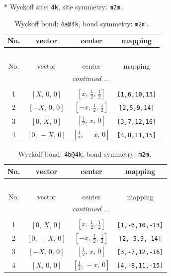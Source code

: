 \documentclass[fleqn,8pt]{jsarticle}
\begin{document}
* Wyckoff site: {\tt 4k}, site symmetry: {\tt m2m.}
\renewcommand{\arraystretch}{1.2}
\begin{longtable}{cccc}
\caption{Wyckoff bond: {\tt 4a@4k}, bond symmetry: {\tt m2m.}}
 \\
 \hline \hline
No. & vector & center & mapping \\ \hline \endfirsthead

\multicolumn{3}{l}{\tablename\ \thetable{}} \\
 \hline \hline
No. & vector & center & mapping \\ \hline \endhead

 \hline \hline
\multicolumn{3}{r}{\footnotesize\it continued ...} \\ \endfoot

 \hline \hline
\multicolumn{3}{r}{} \\ \endlastfoot

1 & $\left[ X,\, 0,\, 0 \right]$ & $\left[ x,\, \frac{1}{2},\, \frac{1}{2} \right]$ & {\tt [1,6,10,13]} \\ \hline
2 & $\left[ - X,\, 0,\, 0 \right]$ & $\left[ - x,\, \frac{1}{2},\, \frac{1}{2} \right]$ & {\tt [2,5,9,14]} \\ \hline
3 & $\left[ 0,\, X,\, 0 \right]$ & $\left[ \frac{1}{2},\, x,\, 0 \right]$ & {\tt [3,7,12,16]} \\ \hline
4 & $\left[ 0,\, - X,\, 0 \right]$ & $\left[ \frac{1}{2},\, - x,\, 0 \right]$ & {\tt [4,8,11,15]} \\
\end{longtable}
\renewcommand{\arraystretch}{1.2}
\begin{longtable}{cccc}
\caption{Wyckoff bond: {\tt 4b@4k}, bond symmetry: {\tt m2m.}}
 \\
 \hline \hline
No. & vector & center & mapping \\ \hline \endfirsthead

\multicolumn{3}{l}{\tablename\ \thetable{}} \\
 \hline \hline
No. & vector & center & mapping \\ \hline \endhead

 \hline \hline
\multicolumn{3}{r}{\footnotesize\it continued ...} \\ \endfoot

 \hline \hline
\multicolumn{3}{r}{} \\ \endlastfoot

1 & $\left[ 0,\, X,\, 0 \right]$ & $\left[ x,\, \frac{1}{2},\, \frac{1}{2} \right]$ & {\tt [1,-6,10,-13]} \\ \hline
2 & $\left[ 0,\, - X,\, 0 \right]$ & $\left[ - x,\, \frac{1}{2},\, \frac{1}{2} \right]$ & {\tt [2,-5,9,-14]} \\ \hline
3 & $\left[ - X,\, 0,\, 0 \right]$ & $\left[ \frac{1}{2},\, x,\, 0 \right]$ & {\tt [3,-7,12,-16]} \\ \hline
4 & $\left[ X,\, 0,\, 0 \right]$ & $\left[ \frac{1}{2},\, - x,\, 0 \right]$ & {\tt [4,-8,11,-15]} \\
\end{longtable}
\end{document}
